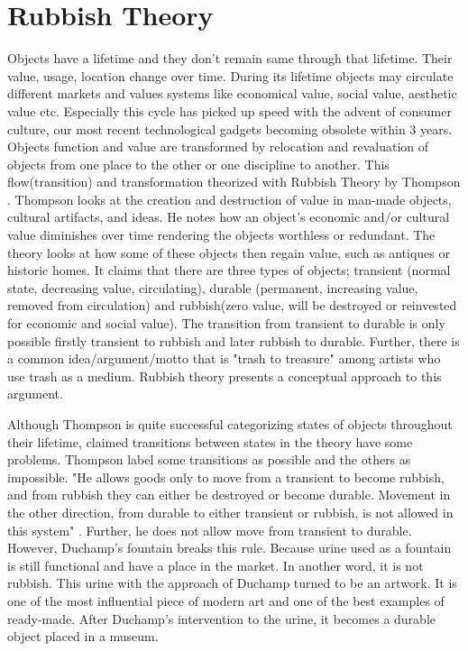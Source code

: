 \section{Rubbish Theory}
Objects have a lifetime and they don't remain same through that lifetime. Their value, usage, location change over time. During its lifetime objects may circulate different markets and values systems like economical value, social value, aesthetic value etc. Especially this cycle has picked up speed with the advent of consumer culture, our most recent technological gadgets becoming obsolete within 3 years. Objects function and value are transformed by relocation and revaluation of objects from one place to the other or one discipline to another. This flow(transition) and transformation theorized with Rubbish Theory by Thompson \cite{thompson1979rubbish}. Thompson looks at the creation and destruction of value in man-made objects, cultural artifacts, and ideas. He notes how an object’s economic and/or cultural value diminishes over time rendering the objects worthless or redundant. The theory looks at how some of these objects then regain value, such as antiques or historic homes. It claims that there are three types of objects; transient (normal state, decreasing value, circulating), durable (permanent, increasing value, removed from circulation) and rubbish(zero value, will be destroyed or reinvested for economic and social value). The transition from transient to durable is only possible firstly transient to rubbish and later rubbish to durable. Further, there is a common idea/argument/motto that is "trash to treasure" among artists who use trash as a medium. Rubbish theory presents a conceptual approach to this argument. 

Although Thompson is quite successful categorizing states of objects throughout their lifetime, claimed transitions between states in the theory have some problems. Thompson label some transitions as possible and the others as impossible. "He allows goods only to move from a transient to become rubbish, and from rubbish they can either be destroyed or become durable. Movement in the other direction, from durable to either transient or rubbish, is not allowed in this system" \cite{meadow2011relocation}. Further, he does not allow move from transient to durable. However, Duchamp's fountain breaks this rule. Because urine used as a fountain is still functional and have a place in the market. In another word, it is not rubbish. This urine with the approach of Duchamp turned to be an artwork. It is one of the most influential piece of modern art and one of the best examples of ready-made. After Duchamp's intervention to the urine, it becomes a durable object placed in a museum.

